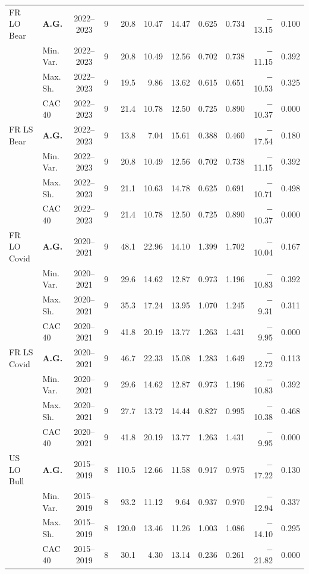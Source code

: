 \begin{longtable}{p{2.6cm} l c c r r r r r r r}
FR LO Bear & \textbf{A.G.} & 2022--2023 & 9 & 20.8 & 10.47 & 14.47 & 0.625 & 0.734 & $-$13.15 & 0.100 \\
 & Min.\,Var. & 2022--2023 & 9 & 20.8 & 10.49 & 12.56 & 0.702 & 0.738 & $-$11.15 & 0.392 \\
 & Max.\,Sh. & 2022--2023 & 9 & 19.5 & 9.86 & 13.62 & 0.615 & 0.651 & $-$10.53 & 0.325 \\
 & CAC 40 & 2022--2023 & 9 & 21.4 & 10.78 & 12.50 & 0.725 & 0.890 & $-$10.37 & 0.000 \\
\midrule
FR LS Bear & \textbf{A.G.} & 2022--2023 & 9 & 13.8 & 7.04 & 15.61 & 0.388 & 0.460 & $-$17.54 & 0.180 \\
 & Min.\,Var. & 2022--2023 & 9 & 20.8 & 10.49 & 12.56 & 0.702 & 0.738 & $-$11.15 & 0.392 \\
 & Max.\,Sh. & 2022--2023 & 9 & 21.1 & 10.63 & 14.78 & 0.625 & 0.691 & $-$10.71 & 0.498 \\
 & CAC 40 & 2022--2023 & 9 & 21.4 & 10.78 & 12.50 & 0.725 & 0.890 & $-$10.37 & 0.000 \\
\midrule
FR LO Covid & \textbf{A.G.} & 2020--2021 & 9 & 48.1 & 22.96 & 14.10 & 1.399 & 1.702 & $-$10.04 & 0.167 \\
 & Min.\,Var. & 2020--2021 & 9 & 29.6 & 14.62 & 12.87 & 0.973 & 1.196 & $-$10.83 & 0.392 \\
 & Max.\,Sh. & 2020--2021 & 9 & 35.3 & 17.24 & 13.95 & 1.070 & 1.245 & $-$9.31 & 0.311 \\
 & CAC 40 & 2020--2021 & 9 & 41.8 & 20.19 & 13.77 & 1.263 & 1.431 & $-$9.95 & 0.000 \\
\midrule
FR LS Covid & \textbf{A.G.} & 2020--2021 & 9 & 46.7 & 22.33 & 15.08 & 1.283 & 1.649 & $-$12.72 & 0.113 \\
 & Min.\,Var. & 2020--2021 & 9 & 29.6 & 14.62 & 12.87 & 0.973 & 1.196 & $-$10.83 & 0.392 \\
 & Max.\,Sh. & 2020--2021 & 9 & 27.7 & 13.72 & 14.44 & 0.827 & 0.995 & $-$10.38 & 0.468 \\
 & CAC 40 & 2020--2021 & 9 & 41.8 & 20.19 & 13.77 & 1.263 & 1.431 & $-$9.95 & 0.000 \\
\midrule
US LO Bull & \textbf{A.G.} & 2015--2019 & 8 & 110.5 & 12.66 & 11.58 & 0.917 & 0.975 & $-$17.22 & 0.130 \\
 & Min.\,Var. & 2015--2019 & 8 & 93.2 & 11.12 & 9.64 & 0.937 & 0.970 & $-$12.94 & 0.337 \\
 & Max.\,Sh. & 2015--2019 & 8 & 120.0 & 13.46 & 11.26 & 1.003 & 1.086 & $-$14.10 & 0.295 \\
 & CAC 40 & 2015--2019 & 8 & 30.1 & 4.30 & 13.14 & 0.236 & 0.261 & $-$21.82 & 0.000 \\

\end{longtable}
